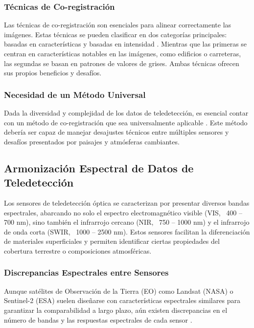             \subsubsection{Técnicas de Co-registración}
                Las técnicas de co-registración son esenciales para alinear correctamente las imágenes. Estas técnicas se pueden clasificar en dos categorías principales: basadas en características y basadas en intensidad \autocite{zitova2003image}. Mientras que las primeras se centran en características notables en las imágenes, como edificios o carreteras, las segundas se basan en patrones de valores de grises. Ambas técnicas ofrecen sus propios beneficios y desafíos. 
                
            \subsubsection{Necesidad de un Método Universal}
                Dada la diversidad y complejidad de los datos de teledetección, es esencial contar con un método de co-registración que sea universalmente aplicable \autocite{chen2003mutual}. Este método debería ser capaz de manejar desajustes técnicos entre múltiples sensores y desafíos presentados por paisajes y atmósferas cambiantes.

        \subsection{Armonización Espectral de Datos de Teledetección}
            Los sensores de teledetección óptica se caracterizan por presentar diversos bandas espectrales, abarcando no solo el espectro electromagnético visible (VIS, ~400 – 700 nm), sino también el infrarrojo cercano (NIR, ~750 – 1000 nm) y el infrarrojo de onda corta (SWIR, ~1000 – 2500 nm). Estos sensores facilitan la diferenciación de materiales superficiales y permiten identificar ciertas propiedades del cobertura terrestre o composiciones atmosféricas.
            
            \subsubsection{Discrepancias Espectrales entre Sensores}
                Aunque satélites de Observación de la Tierra (EO) como Landsat (NASA) o Sentinel-2 (ESA) suelen diseñarse con características espectrales similares para garantizar la comparabilidad a largo plazo, aún existen discrepancias en el número de bandas y las respuestas espectrales de cada sensor \autocite{drusch2012sentinel}.
                
